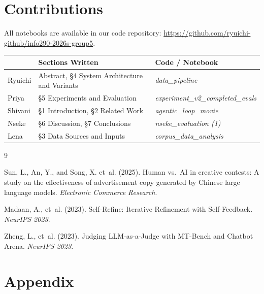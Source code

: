 \documentclass[10pt,twocolumn]{article}
\begin{document}
\section*{Contributions}

All notebooks are available in our code repository: \url{https://github.com/ryuichi-github/info290-2026s-group5}.

\begin{table}[h]
\centering
\small
\begin{tabularx}{\columnwidth}{l>{\raggedright\arraybackslash}X>{\raggedright\arraybackslash}X}
\toprule
 & \textbf{Sections Written} & \textbf{Code / Notebook} \\
\midrule
Ryuichi & Abstract, \S4 System Architecture and Variants & \textit{data\_pipeline} \\
\midrule
Priya & \S5 Experiments and Evaluation & \textit{experiment\_v2\_completed\_evals} \\
\midrule
Shivani & \S1 Introduction, \S2 Related Work & \textit{agentic\_loop\_movie} \\
\midrule
Nseke & \S6 Discussion, \S7 Conclusions & \textit{nseke\_evaluation (1)}\\
\midrule
Lena & \S3 Data Sources and Inputs & \textit{corpus\_data\_analysis} \\
\bottomrule
\end{tabularx}
\end{table}

\begin{thebibliography}{9}

Sun, L., An, Y., and Song, X. et~al. (2025).
Human vs.\ AI in creative contests: A study on the effectiveness of advertisement copy generated by Chinese large language models.
\textit{Electronic Commerce Research}.

Madaan, A., et~al. (2023).
Self-Refine: Iterative Refinement with Self-Feedback.
\textit{NeurIPS 2023}.

Zheng, L., et~al. (2023).
Judging LLM-as-a-Judge with MT-Bench and Chatbot Arena.
\textit{NeurIPS 2023}.

\end{thebibliography}

\clearpage
\onecolumn
\appendix

\section*{Appendix}
\end{document}
